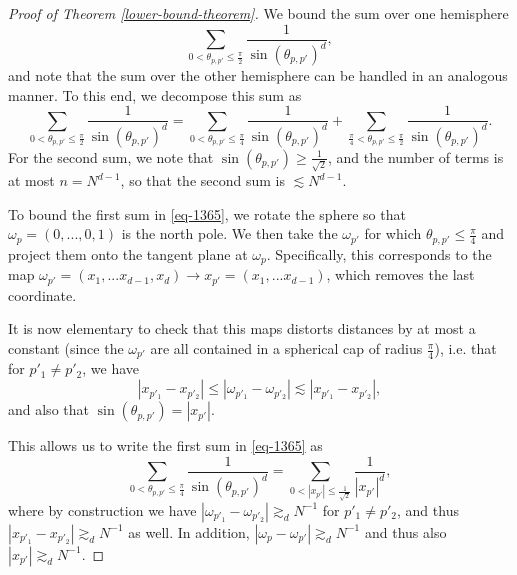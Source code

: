 \begin{proof}[Proof of Theorem \ref{lower-bound-theorem}]
We bound the sum over one hemisphere
\begin{equation}
 \sum_{0 < \theta_{p,p'}\leq \frac{\pi}{2}}\frac{1}{\sin(\theta_{p,p'})^d},
\end{equation}
and note that the sum over the other hemisphere can be handled in an analogous manner. To this end, we decompose this sum as
\begin{equation}\label{eq-1365}
 \sum_{0 < \theta_{p,p'}\leq \frac{\pi}{2}}\frac{1}{\sin(\theta_{p,p'})^d} = \sum_{0 < \theta_{p,p'}\leq \frac{\pi}{4}}\frac{1}{\sin(\theta_{p,p'})^d} + \sum_{\frac{\pi}{4} < \theta_{p,p'}\leq \frac{\pi}{2}}\frac{1}{\sin(\theta_{p,p'})^d}.
\end{equation}
For the second sum, we note that $\sin(\theta_{p,p'}) \geq \frac{1}{\sqrt{2}}$, and the number of terms is at most $n = N^{d-1}$, so that the second sum is $\lesssim N^{d-1}$. 

To bound the first sum in \eqref{eq-1365}, we rotate the sphere so that $\omega_p = (0,...,0,1)$ is the north pole. We then take the $\omega_{p'}$ for which $\theta_{p,p'}\leq \frac{\pi}{4}$ and project them onto the tangent plane at $\omega_p$. Specifically, this corresponds to the map $\omega_{p'} = (x_1,...x_{d-1},x_d)\rightarrow x_{p'} = (x_1,...x_{d-1})$, which removes the last coordinate. 

It is now elementary to check that this maps distorts distances by at most a constant (since the $\omega_{p'}$ are all contained in a spherical cap of radius $\frac{\pi}{4}$), i.e. that for $p'_1\neq p'_2$, we have
\begin{equation}
 |x_{p'_1} - x_{p'_2}| \leq |\omega_{p'_1} - \omega_{p'_2}| \lesssim |x_{p'_1} - x_{p'_2}|,
\end{equation}
and also that $\sin(\theta_{p,p'}) = |x_{p'}|$.

This allows us to write the first sum in \eqref{eq-1365} as
\begin{equation}
 \sum_{0 < \theta_{p,p'}\leq \frac{\pi}{4}}\frac{1}{\sin(\theta_{p,p'})^d} = \sum_{0<|x_{p'}|\leq \frac{1}{\sqrt{2}}}\frac{1}{|x_{p'}|^d},
\end{equation}
where by construction we have $|\omega_{p'_1} - \omega_{p'_2}| \gtrsim_d N^{-1}$ for $p'_1\neq p'_2$, and thus $|x_{p'_1} - x_{p'_2}|\gtrsim_d N^{-1}$ as well. In addition, $|\omega_p - \omega_{p'}| \gtrsim_d N^{-1}$ and thus also $|x_{p'}| \gtrsim_d N^{-1}$.


\end{proof}
